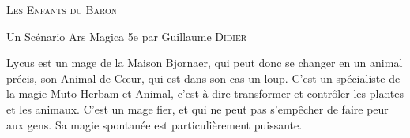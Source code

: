 

\begin{center}
\vfill
    {\Large\scshape Les Enfants du Baron\par}
    \vspace{0.5cm}
{Un Scénario Ars Magica 5e par Guillaume \textsc{Didier}\par}
    \vfill
    {\LARGE\bfseries \magusname \par}



\vfill
    \begin{center}
        \parbox{.8\textwidth}{
            Lycus est un mage de la Maison Bjornaer, qui peut donc se changer en un animal précis, son Animal de Cœur, qui est dans son cas un loup. C'est un spécialiste de la magie Muto Herbam et Animal, c'est à dire transformer et contrôler les plantes et les animaux. C'est un mage fier, et qui ne peut pas s'empêcher de faire peur aux gens. Sa magie spontanée est particulièrement puissante.}
    \end{center}
\vfill
\end{center}
\pagebreak




